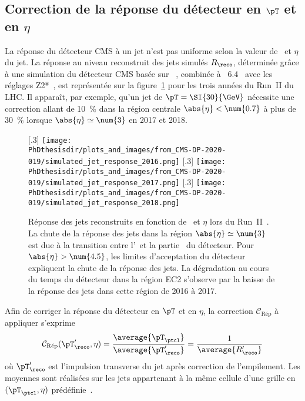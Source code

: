 \subsection{Correction de la réponse du détecteur en $\pT$ et en $\eta$}\label{chapter-JERC-section-CMS-subsec-reponse}
La réponse du détecteur CMS à un jet n'est pas uniforme selon la valeur de \pT\ et $\eta$ du jet.
La réponse au niveau reconstruit des jets simulés $R_\reco$,
déterminée grâce à une simulation du détecteur CMS basée sur \GEANTfour~\cite{geant4_2003,geant4_2006,geant4_2016},
combinée à \PYTHIA~6.4~\cite{pythia6.4}
avec les réglages Z2*~\cite{tunes_2016},
est représentée sur la figure~\ref{fig-simulated_jet_response_RunII} pour les trois années du Run~II du LHC.
Il apparaît, par exemple, qu'un jet de $\pT=\SI{30}{\GeV}$ nécessite une correction allant de \SI{10}{\%} dans la région centrale $\abs{\eta}<\num{0.7}$ à plus de \SI{30}{\%} lorsque $\abs{\eta}\simeq\num{3}$ en 2017 et 2018.
\begin{figure}[h]
\centering
{}[.3\textwidth]
{\texttt{[image: \\PhDthesisdir/plots\_and\_images/from\_CMS-DP-2020-019/simulated\_jet\_response\_2016.png]}}
\hfill
{}[.3\textwidth]
{\texttt{[image: \\PhDthesisdir/plots\_and\_images/from\_CMS-DP-2020-019/simulated\_jet\_response\_2017.png]}}
\hfill
{}[.3\textwidth]
{\texttt{[image: \\PhDthesisdir/plots\_and\_images/from\_CMS-DP-2020-019/simulated\_jet\_response\_2018.png]}}
\caption[Réponse des jets reconstruits en fonction de \pT\ et $\eta$ lors du Run~II.]{Réponse des jets reconstruits en fonction de \pT\ et $\eta$ lors du Run~II~\cite{CMS-DP-2020-019}. La chute de la réponse des jets dans la région $\abs{\eta}\simeq\num{3}$ est due à la transition entre l'\CMSendcap\ et la partie \CMSforward\ du détecteur. Pour $\abs{\eta}>\num{4.5}$, les limites d'acceptation du détecteur expliquent la chute de la réponse des jets. La dégradation au cours du temps du détecteur dans la région \og EC2 \fg{} s'observe par la baisse de la réponse des jets dans cette région de 2016 à 2017.}
\label{fig-simulated_jet_response_RunII}
\end{figure}
\par Afin de corriger la réponse du détecteur en $\pT$ et en $\eta$, la correction $\mathcal{C}_\text{Rép}$ à appliquer s'exprime
\begin{equation}
\mathcal{C}_\text{Rép}(\pT_\reco', \eta) = \frac{\average{\pT_\ptcl}}{\average{\pT_\reco'}} = \frac{1}{\average{R_\reco'}}
\end{equation}
où $\pT_\reco'$ est l'impulsion transverse du jet après correction de l'empilement.
Les moyennes sont réalisées sur les jets appartenant à la même cellule d'une grille en $(\pT_\ptcl, \eta)$ prédéfinie~\cite{JERC_RunI}.
